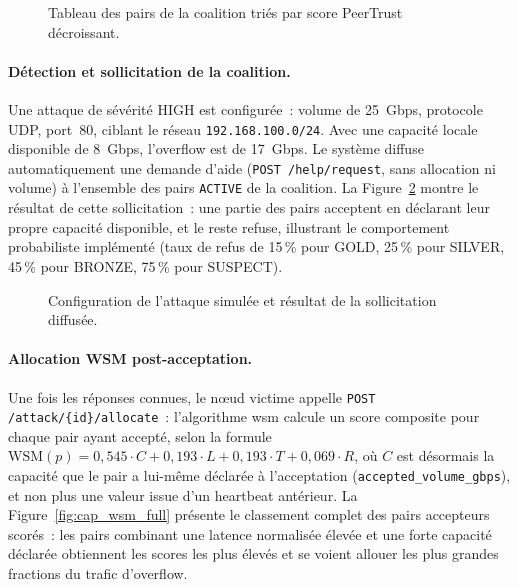 \begin{figure}[H]
\centering
{}
\caption{Tableau des pairs de la coalition triés par score PeerTrust décroissant.}
\label{fig:cap_nodes}
\end{figure}

\paragraph{Détection et sollicitation de la coalition.}
Une attaque de sévérité HIGH est configurée~: volume de 25~Gbps, protocole UDP, port~80, ciblant le réseau \texttt{192.168.100.0/24}. Avec une capacité locale disponible de 8~Gbps, l'overflow est de 17~Gbps. Le système diffuse automatiquement une demande d'aide (\texttt{POST /help/request}, sans allocation ni volume) à l'ensemble des pairs \texttt{ACTIVE} de la coalition. La Figure~\ref{fig:cap_db_attack_wsm} montre le résultat de cette sollicitation~: une partie des pairs acceptent en déclarant leur propre capacité disponible, et le reste refuse, illustrant le comportement probabiliste implémenté (taux de refus de 15\,\% pour GOLD, 25\,\% pour SILVER, 45\,\% pour BRONZE, 75\,\% pour SUSPECT).

\begin{figure}[H]
\centering
{}
\caption{Configuration de l'attaque simulée et résultat de la sollicitation diffusée.}
\label{fig:cap_db_attack_wsm}
\end{figure}

\paragraph{Allocation WSM post-acceptation.}
Une fois les réponses connues, le nœud victime appelle \texttt{POST /attack/\{id\}/allocate}~: l'algorithme \gls{wsm} calcule un score composite pour chaque pair ayant accepté, selon la formule $\text{WSM}(p) = 0{,}545 \cdot C + 0{,}193 \cdot L + 0{,}193 \cdot T + 0{,}069 \cdot R$, où $C$ est désormais la capacité que le pair a lui-même déclarée à l'acceptation (\texttt{accepted\_volume\_gbps}), et non plus une valeur issue d'un heartbeat antérieur. La Figure~\ref{fig:cap_wsm_full} présente le classement complet des pairs accepteurs scorés~: les pairs combinant une latence normalisée élevée et une forte capacité déclarée obtiennent les scores les plus élevés et se voient allouer les plus grandes fractions du trafic d'overflow.

